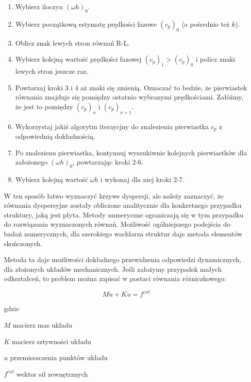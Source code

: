 \begin{enumerate}
  \item Wybierz iloczyn \((\omega h)_0\).
  \item Wybierz początkową estymatę prędkości fazowe \((c_p)_0\) (a pośrednio też \(k\)).
  \item Oblicz znak lewych stron równań R-L.
  \item Wybierz kolejną wartość prędkości fazowej \((c_p)_1 > (c_p)_0\) i policz znaki lewych stron jeszcze raz.
  \item Powtarzaj kroki 3 i 4 aż znaki się zmienią. Oznaczać to bedzie, że pierwiastek równania znajduje się pomiędzy ostatnio wybranymi prędkościami. Załóżmy, że jest to pomiędzy \( (c_p)_n \) i \( (c_p)_{n+1} \).
  \item Wykorzystaj jakiś algorytm iteraycjny do znalezienia pierwiastka \(c_p\) z odpowiednią dokładnością.
   \item Po znalezienu pierwiastka, kontynuuj wyszukiwnie kolejnych pierwiastków dla założonego \( (\omega h)_0 \), powtarzając kroki 2-6.
  \item Wybierz kolejną wartość \( \omega h \) i wykonaj dla niej kroki 2-7.
\end{enumerate}

\vspace{5mm}

W ten sposób łatwo wyznaczyć krzywe dyspersji, ale należy zaznaczyć, że równania dyspersyjne zostały obliczone analitycznie dla konkretnego przypadku struktury, jaką jest płyta. Metody numeryczne ograniczają się w tym przypadku do rozwiązania wyznaczonych równań. Możliwość ogólniejszego podejścia do badań numerycznych, dla szerokiego wachlarza struktur daje metoda elementów skończonych.

Metoda ta daje możliwości dokładnego przewidzenia odpowiedzi dynamicznych, dla złożonych układów mechanicznych. Jeśli założymy przypadek małych odkształceń, to problem można zapisać w postaci równania różniczkowego:

\begin{equation} \label{eq:MES1}
M\ddot u + Ku = f^{ext}
\end{equation}

gdzie
\begin{eqwhere}[2cm]
        \item[$M$] macierz mas układu
        \item[$K$] macierz sztywności układu 
        \item[$u$] przemieszczenia punktów układu
        \item[$f^{ext}$] wektor sił zewnętrznych
\end{eqwhere}

